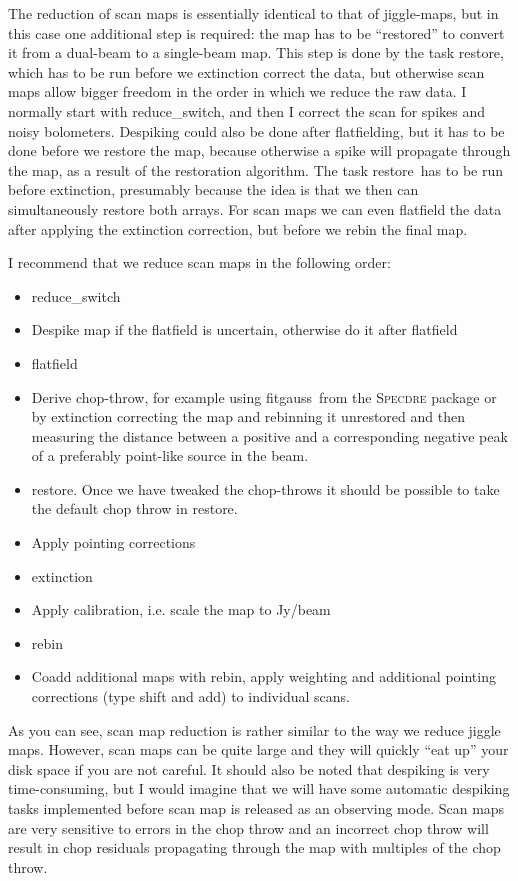 \documentclass[twoside,11pt]{article}
\newcommand{\Specdre}{\xref{\textsc{Specdre}}{sun140}{}}
\newcommand{\task}[1]{\textsf{#1}}
\newcommand{\rebin}{\xref{\task{rebin}}{sun216}{REBIN}}
\newcommand{\resw}{\xref{\task{reduce\_switch}}{sun216}{REDUCE_SWITCH}}
\newcommand{\flatf}{\xref{\task{flatfield}}{sun216}{FLATFIELD}}
\newcommand{\ext}{\xref{\task{extinction}}{sun216}{EXTINCTION}}
\newcommand{\restore}{\xref{\task{restore}}{sun216}{RESTORE}}
\newcommand{\fitgauss}{\xref{\task{fitgauss}}{sun140}{FITGAUSS}}
\newcommand{\xref}[3]{#1}
\begin{document}
{The reduction of scan maps is essentially identical to that of
jiggle-maps, but in this case one additional step is required: the map has
to be ``restored'' to convert it from a dual-beam to a single-beam map.
This step is done by the task \restore, which has to be run before
we extinction correct the data, but otherwise scan maps allow bigger
freedom in the order in which we reduce the raw data. I normally start
with \resw, and then I correct the scan for spikes and
noisy bolometers. Despiking could also be done after flatfielding,
but it has to be done before we restore the map, because otherwise a
spike will propagate through the map, as a result of the restoration
algorithm. The task \restore\ has to be run before \ext,
presumably because the idea is that we then can simultaneously restore
both arrays. For scan maps we can even flatfield the data after applying
the extinction correction, but before we rebin the final map.

I recommend that we reduce scan maps in the following order:
\begin {itemize}
\item \resw\
\item Despike map if the flatfield is uncertain, otherwise do it after \flatf\
\item \flatf\
\item Derive chop-throw, for example using \fitgauss\ from the \Specdre
\cite{specdre} package or by extinction correcting the map and rebinning it
unrestored and then measuring the distance between a positive and a
corresponding negative peak of a preferably point-like source in the beam.
\item \restore. Once we have tweaked the chop-throws it should be
possible to take the default chop throw in \restore.
\item Apply pointing corrections
\item \ext\
\item Apply calibration, i.e. scale the map to Jy/beam
\item \rebin
\item Coadd additional maps with \rebin, apply weighting and
additional pointing corrections (type shift and add) to individual scans.
\end {itemize}

As you can see, scan map reduction is rather similar to the way we reduce
jiggle maps. However, scan maps can be quite large and they will quickly
``eat up'' your disk space if you are not careful. It should also be noted
that despiking is very time-consuming, but I would imagine that we will have
some automatic despiking tasks implemented before scan map is released as an
observing mode. Scan maps are very sensitive to errors in the chop throw and
an incorrect chop throw will result in chop residuals propagating through the
map with multiples of the chop throw.

}
\end{document}
